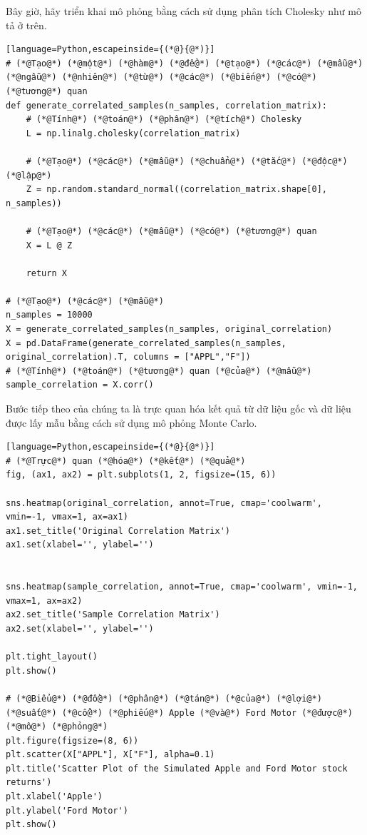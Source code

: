 Bây giờ, hãy triển khai mô phỏng bằng cách sử dụng phân tích Cholesky như mô tả ở trên.

\begin{lstlisting}[language=Python,escapeinside={(*@}{@*)}]
# (*@Tạo@*) (*@một@*) (*@hàm@*) (*@để@*) (*@tạo@*) (*@các@*) (*@mẫu@*) (*@ngẫu@*) (*@nhiên@*) (*@từ@*) (*@các@*) (*@biến@*) (*@có@*) (*@tương@*) quan
def generate_correlated_samples(n_samples, correlation_matrix):
    # (*@Tính@*) (*@toán@*) (*@phân@*) (*@tích@*) Cholesky
    L = np.linalg.cholesky(correlation_matrix)

    # (*@Tạo@*) (*@các@*) (*@mẫu@*) (*@chuẩn@*) (*@tắc@*) (*@độc@*) (*@lập@*)
    Z = np.random.standard_normal((correlation_matrix.shape[0], n_samples))

    # (*@Tạo@*) (*@các@*) (*@mẫu@*) (*@có@*) (*@tương@*) quan
    X = L @ Z

    return X

# (*@Tạo@*) (*@các@*) (*@mẫu@*)
n_samples = 10000
X = generate_correlated_samples(n_samples, original_correlation)
X = pd.DataFrame(generate_correlated_samples(n_samples, original_correlation).T, columns = ["APPL","F"])
# (*@Tính@*) (*@toán@*) (*@tương@*) quan (*@của@*) (*@mẫu@*)
sample_correlation = X.corr()
\end{lstlisting}

Bước tiếp theo của chúng ta là trực quan hóa kết quả từ dữ liệu gốc và dữ liệu được lấy mẫu bằng cách sử dụng mô phỏng Monte Carlo.

\begin{lstlisting}[language=Python,escapeinside={(*@}{@*)}]
# (*@Trực@*) quan (*@hóa@*) (*@kết@*) (*@quả@*)
fig, (ax1, ax2) = plt.subplots(1, 2, figsize=(15, 6))

sns.heatmap(original_correlation, annot=True, cmap='coolwarm', vmin=-1, vmax=1, ax=ax1)
ax1.set_title('Original Correlation Matrix')
ax1.set(xlabel='', ylabel='')


sns.heatmap(sample_correlation, annot=True, cmap='coolwarm', vmin=-1, vmax=1, ax=ax2)
ax2.set_title('Sample Correlation Matrix')
ax2.set(xlabel='', ylabel='')

plt.tight_layout()
plt.show()

# (*@Biểu@*) (*@đồ@*) (*@phân@*) (*@tán@*) (*@của@*) (*@lợi@*) (*@suất@*) (*@cổ@*) (*@phiếu@*) Apple (*@và@*) Ford Motor (*@được@*) (*@mô@*) (*@phỏng@*)
plt.figure(figsize=(8, 6))
plt.scatter(X["APPL"], X["F"], alpha=0.1)
plt.title('Scatter Plot of the Simulated Apple and Ford Motor stock returns')
plt.xlabel('Apple')
plt.ylabel('Ford Motor')
plt.show()
\end{lstlisting}

